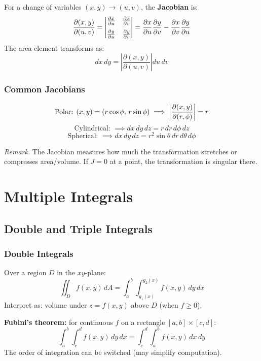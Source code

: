 \documentclass[11pt, letterpaper]{article}
\theoremstyle{plain}
\newenvironment{remark}{\smallskip\noindent\textit{Remark.}}{\smallskip}
\begin{document}
For a change of variables $(x,y)\to(u,v)$, the \textbf{Jacobian} is:
\[
    \frac{\partial(x,y)}{\partial(u,v)} =
    \begin{vmatrix}
        \pdv{x}{u} & \pdv{x}{v} \\[6pt]
        \pdv{y}{u} & \pdv{y}{v}
    \end{vmatrix}
    = \pdv{x}{u}\pdv{y}{v} - \pdv{x}{v}\pdv{y}{u}
\]
The area element transforms as:
\[
    dx\,dy = \left|\frac{\partial(x,y)}{\partial(u,v)}\right|du\,dv
\]

\subsubsection*{Common Jacobians}
\[
    \text{Polar: } (x,y) = (r\cos\phi,\, r\sin\phi) \implies
    \left|\pdv{(x,y)}{(r,\phi)}\right| = r
\]
\[
    \text{Cylindrical: } \implies dx\,dy\,dz = r\,dr\,d\phi\,dz
\]
\[
    \text{Spherical: } \implies dx\,dy\,dz = r^2\sin\theta\,dr\,d\theta\,d\phi
\]

\begin{remark}
    The Jacobian measures how much the transformation stretches or compresses
    area/volume. If $J = 0$ at a point, the transformation is singular there.
\end{remark}


\newpage
\section{Multiple Integrals}                   %

\subsection{Double and Triple Integrals}

\subsubsection*{Double Integrals}
Over a region $D$ in the $xy$-plane:
\[
    \iint_D f(x,y)\,dA = \int_a^b\int_{g_1(x)}^{g_2(x)} f(x,y)\,dy\,dx
\]
Interpret as: volume under $z = f(x,y)$ above $D$ (when $f \geq 0$).

\textbf{Fubini's theorem:} for continuous $f$ on a rectangle $[a,b]\times[c,d]$:
\[
    \int_a^b\int_c^d f(x,y)\,dy\,dx = \int_c^d\int_a^b f(x,y)\,dx\,dy
\]
The order of integration can be switched (may simplify computation).
\end{document}
